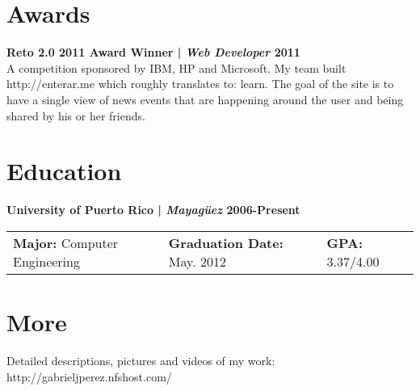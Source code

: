 \documentclass[margin,line]{res}
\begin{document}
\begin{resume}
\section{\sc Awards}

{\bf Reto 2.0 2011 Award Winner | {\em Web Developer} \hfill {\bf 2011 \\} }
\vspace{-.01cm}
A competition sponsored by IBM, HP and Microsoft. My team built http://enterar.me which roughly translates to: learn. The goal of the site is to have a single view of news events that are happening around the user and being shared by his or her friends. 





\section{\sc Education}

{\bf University of Puerto Rico | {\em Mayag\"uez } \hfill {\bf 2006-Present } }
\vspace{-.01cm}
\begin{tabular}{@{}p{2in}p{2in}p{2in}}
 {\bf Major:} Computer Engineering           & {\bf Graduation Date:} May. 2012  & {\bf GPA:} 3.37/4.00  \\            
\end{tabular}


\section{\sc More}
Detailed descriptions, pictures and videos of my work: http://gabrieljperez.nfshost.com/    \\

\end{resume}
\end{document}
